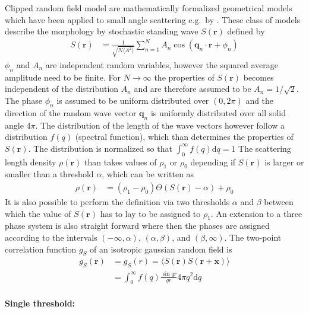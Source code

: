 Clipped random field model are mathematically formalized geometrical models which have been applied to small angle scattering e.g.\ by \cite{Berk1991,Teubner1991,Levitz1998,Roberts1995}. These class of models describe the morphology by stochastic standing wave $S(\mathbf{r})$ defined by
\begin{align}
S(\mathbf{r}) &= \frac{1}{\sqrt{N\langle A^2\rangle}} \sum_{n=1}^N A_n \cos\left(\mathbf{q}_n\cdot\mathbf{r}+\phi_n\right)
\end{align}
$\phi_n$ and $A_n$ are independent random variables, however the squared average amplitude need to be finite. For $N\rightarrow \infty$ the properties of $S(\mathbf{r})$ becomes independent of the distribution $A_n$ and are therefore assumed to be $A_n=1/\sqrt{2}$. The phase $\phi_n$ is assumed to be uniform distributed over $(0,2\pi)$ and the direction of the random wave vector $\mathbf{q}_n$ is uniformly distributed over all solid angle $4\pi$. The distribution of the length of the wave vectors however follow a distribution $f(q)$ (spectral function), which than determines the properties of $S(\mathbf{r})$. The distribution is normalized so that $\int_0^\infty f(q) \mathrm{d}q=1$ The scattering length density $\rho(\mathbf{r})$ than takes values of $\rho_1$ or $\rho_0$ depending if $S(\mathbf{r})$ is larger or smaller than a threshold $\alpha$, which can be written as
\begin{align}
  \rho(\mathbf{r}) & = (\rho_1-\rho_0) \Theta(S(\mathbf{r})-\alpha) + \rho_0
\end{align}
It is also possible to perform the definition via two thresholds $\alpha$ and $\beta$ between which the value of $S(\mathbf{r})$ has to lay to be assigned to $\rho_1$. An extension to a three phase system is also straight forward where then the phases are assigned according to the intervals $(-\infty,\alpha)$, $(\alpha,\beta)$, and $(\beta,\infty)$.
The two-point correlation function $g_S$ of an isotropic gaussian random field is
\begin{align}\label{eq:gr_CGRF}
  g_S(\mathbf{r}) &= g_S(r) = \langle S(\mathbf{r}) S(\mathbf{r}+\mathbf{x}) \rangle \\
                  &= \int_0^\infty f(q) \frac{\sin qr}{qr} 4\pi q^2 \mathrm{d}q
\end{align}

\paragraph*{\textbf{Single threshold:}} \phantom{M}\hspace{1pt} \\

